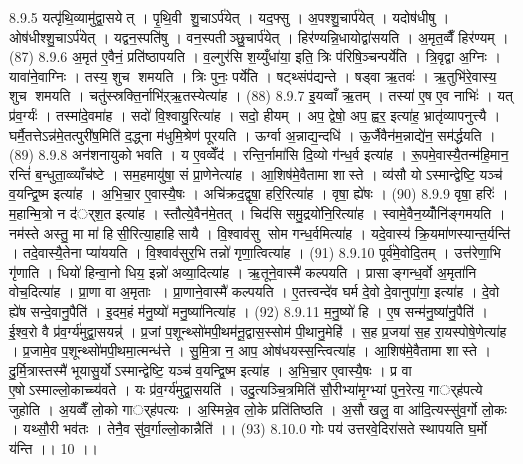 8.9.5
यत्पृ॑थि॒व्यामु॑द्वा॒सयेत् । पृ॒थि॒वी शु॒चाऽर्प॑येत् । यद॒फ्सु । अ॒पश्शु॒चार्प॑येत् । यदोष॑धीषु । ओष॑धीश्शु॒चाऽर्प॑येत् । यद्वन॒स्पति॑षु । वन॒स्पतीञ्छु॒चार्प॑येत् । हिर॑ण्यन्नि॒धायोद्वा॑सयति । अ॒मृत॒व्वैँ हिर॑ण्यम् । (87)
8.9.6
अ॒मृत॑ ए॒वैनं॒ प्रति॑ष्ठापयति । व॒ल्गुर॑सि श॒य्युँधा॑या॒ इति॒ त्रिः प॑रिषि॒ञ्चन्पर्ये॑ति । त्रि॒वृद्वा अ॒ग्निः । यावा॑ने॒वाग्निः । तस्य॒ शुच॑ शमयति । त्रिः पुनः॒ पर्ये॑ति । षट्थ्संप॑द्यन्ते । षड्वा ऋ॒तवः॑ । ऋ॒तुभि॑रे॒वास्य॒ शुच॑ शमयति । चतु॑स्स्रक्ति॒र्नाभि॑ऱ्ऋ॒तस्येत्या॑ह । (88)
8.9.7
इ॒यव्वाँ ऋ॒तम् । तस्या॑ ए॒ष ए॒व नाभिः॑ । यत् प्र॑व॒र्ग्यः॑ । तस्मा॑दे॒वमा॑ह । सदो॑ वि॒श्वायु॒रित्या॑ह । सदो॒ हीयम् । अप॒ द्वेषो॒ अप॒ ह्वर॒ इत्या॑ह॒ भ्रातृ॑व्यापनुत्त्यै । घर्मै॒तत्तेऽन्न॑मे॒तत्पुरी॑ष॒मिति॑ द॒द्ध्ना म॑धुमि॒श्रेण॑ पूरयति । ऊर्ग्वा अ॒न्नाद्य॒न्दधि॑ । ऊ॒र्जैवैन॑म॒न्नाद्ये॑न॒ सम॑र्द्धयति । (89)
8.9.8
अन॑शनायुको भवति । य ए॒वव्वेँद॑ । रन्ति॒र्नामा॑सि दि॒व्यो ग॑न्ध॒र्व इत्या॑ह । रू॒पमे॒वास्यै॒तन्म॑हि॒मान॒॒ रन्तिं॑ ब॒न्धुता॒व्व्याँच॑ष्टे । सम॒हमायु॑षा॒ सं प्रा॒णेनेत्या॑ह । आ॒शिष॑मे॒वैतामा शास्ते । व्य॑सौ योऽस्मान्द्वेष्टि॒ यञ्च॑ व॒यन्द्वि॒ष्म इत्या॑ह । अ॒भि॒चा॒र ए॒वास्यै॒षः । अचि॑क्रद॒द्वृषा॒ हरि॒रित्या॑ह । वृषा॒ ह्ये॑षः । (90)
8.9.9
वृषा॒ हरिः॑ । म॒हान्मि॒त्रो न द॑र््श॒त इत्या॑ह । स्तौत्ये॒वैन॑मे॒तत् । चिद॑सि समु॒द्रयो॑नि॒रित्या॑ह । स्वामे॒वैन॒य्योँनि॑ङ्गमयति । नम॑स्ते अस्तु॒ मा मा॑ हिसी॒रित्या॒हाहि॑सायै । वि॒श्वाव॑सु सोम गन्ध॒र्वमित्या॑ह । यदे॒वास्य॑ क्रि॒यमा॑णस्यान्त॒र्यन्ति॑ । तदे॒वास्यै॒तेना प्या॑ययति । वि॒श्वाव॑सुर॒भि तन्नो॑ गृणा॒त्वित्या॑ह । (91)
8.9.10
पूर्व॑मे॒वोदि॒तम् । उत्त॑रेणा॒भि गृ॑णाति । धियो॑ हिन्वा॒नो धिय॒ इन्नो॑ अव्या॒दित्या॑ह । ऋ॒तूने॒वास्मै॑ कल्पयति । प्रासाङ्गन्ध॒र्वो अ॒मृता॑नि वोच॒दित्या॑ह । प्रा॒णा वा अ॒मृताः । प्रा॒णाने॒वास्मै॑ कल्पयति । ए॒तत्त्वन्दे॑व घर्म दे॒वो दे॒वानुपा॑गा॒ इत्या॑ह । दे॒वो ह्ये॑ष सन्दे॒वानु॒पैति॑ । इ॒दम॒हं म॑नु॒ष्यो॑ मनु॒ष्या॑नित्या॑ह । (92)
8.9.11
म॒नु॒ष्यो॑ हि । ए॒ष सन्म॑नु॒ष्या॑नु॒पैति॑ । ई॒श्व॒रो वै प्र॑व॒र्ग्य॑मुद्वा॒सयन्न्॑ । प्र॒जां प॒शून्थ्सो॑मपी॒थम॑नू॒द्वास॒स्सोम॑ पी॒थानु॒मेहि॑ । स॒ह प्र॒जया॑ स॒ह रा॒यस्पोषे॒णेत्या॑ह । प्र॒जामे॒व प॒शून्थ्सो॑मपी॒थमा॒त्मन्ध॑त्ते । सु॒मि॒त्रा न॒ आप॒ ओष॑धयस्स॒न्त्वित्या॑ह । आ॒शिष॑मे॒वैतामा शास्ते । दु॒र्मि॒त्रास्तस्मै॑ भूयासु॒र्योऽस्मान्द्वेष्टि॒ यञ्च॑ व॒यन्द्वि॒ष्म इत्या॑ह । अ॒भि॒चा॒र ए॒वास्यै॒षः । प्र वा ए॒षोऽस्माल्लो॒काच्च्य॑वते । यः प्र॑व॒र्ग्य॑मुद्वा॒सयति॑ । उदु॒त्यञ्चि॒त्रमिति॑ सौ॒रीभ्या॑मृ॒ग्भ्यां पुन॒रेत्य॒ गार््ह॑पत्ये जुहोति । अ॒यव्वैँ लो॒को गार््ह॑पत्यः । अ॒स्मिन्ने॒व लो॒के प्रति॑तिष्ठति । अ॒सौ खलु॒ वा आ॑दि॒त्यस्सु॑व॒र्गो लो॒कः । यथ्सौ॒री भव॑तः । तेनै॒व सु॑व॒र्गाल्लो॒कान्नैति॑ ।। (93)
8.10.0
गोः पय॑ उत्तरवे॒दिरा॑सते स्थापयति घ॒र्मो य॑न्ति ।। 10 ।।
